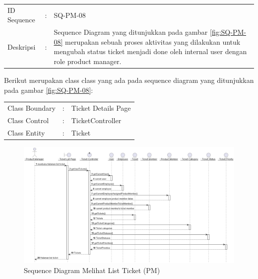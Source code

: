 \documentclass[12pt]{article}
\begin{document}
\begin{enumerate}[label=\textbf{4.\arabic*.}]
\begin{enumerate} [label=\textbf{4.2.\arabic*.}, wide, labelwidth=!, labelindent=0pt]
\begin{enumerate}[label=\textbf{4.2.2.\arabic*.}, wide, labelwidth=!, labelindent=0pt]
\begin{enumerate}[label=\arabic*.]
                \begin{tabularx}{.9\linewidth}{@{} l l X @{}}
                    ID Sequence &	: & SQ-PM-08 \\
                    Deskripsi &	: & Sequence Diagram yang ditunjukkan pada gambar \ref{fig:SQ-PM-08} merupakan sebuah proses aktivitas yang dilakukan untuk mengubah status ticket menjadi done oleh internal user dengan role product manager. 
        
                \end{tabularx}

                \noindent Berikut merupakan class class yang ada pada sequence diagram yang ditunjukkan pada gambar \ref{fig:SQ-PM-08}:

                \begin{tabularx}{.9\linewidth}{@{} l l X @{}}
                    Class Boundary & : & Ticket Details Page \\
                    Class Control & : & TicketController \\
                    Class Entity & : & Ticket
                
                \end{tabularx}
            
                
                \begin{figure}
                    \centering \includegraphics[width=\textwidth]{out/plantuml/sequence/ipm/ipm1/Melihat List Ticket.png}
                    \caption{Sequence Diagram Melihat List Ticket (PM)}
                    \label{fig:SQ-PM-01}
                \end{figure}


\end{enumerate}
\end{enumerate}
\end{enumerate}
\end{enumerate}
\end{document}
